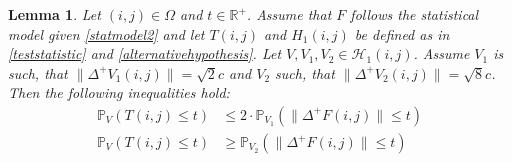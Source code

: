 \documentclass[a4paper,12pt]{article}
\newcommand{\norm}[1]{\lVert#1\rVert}
\theoremstyle{plain}
\newtheorem{lemma}[theorem]{Lemma}
\theoremstyle{definition}
\numberwithin{equation}{section}
\begin{document}
\begin{lemma}\label{lem: typeIIboundssimulation}
	Let $(i, j) \in \Omega$ and $t \in \mathbb{R}^+$. Assume that $F$ follows the statistical model given \eqref{statmodel2} and let $T(i, j)$ and $H_1(i, j)$ be defined as in \eqref{teststatistic} and \eqref{alternativehypothesis}. Let $V, V_1, V_2 \in \mathcal{H}_1(i, j)$. Assume $V_1$ is such, that $\norm{\Delta^+ V_1(i, j)} = \sqrt{2} c$ and $V_2$ such, that $\norm{\Delta^+ V_2(i, j)} = \sqrt{8} c$. Then the following inequalities hold:
	\begin{align}
		\mathbb{P}_V\left( T(i, j) \leq t \right) &\leq 2 \cdot \mathbb{P}_{V_1}\left( \norm{\Delta^+ F(i, j)} \leq t \right) \label{eq: typeIIupperboundsimulation} \\
		\mathbb{P}_V\left( T(i, j) \leq t \right) &\geq \mathbb{P}_{V_2}\left( \norm{\Delta^+ F(i, j)} \leq t \right) \label{eq: typeIIlowerboundsimulation}
	\end{align}
\end{lemma}
\end{document}

